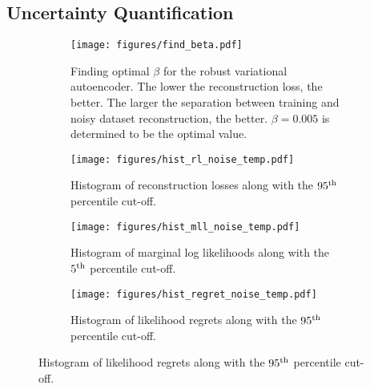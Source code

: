 \subsection{Uncertainty Quantification}
\label{sec:uncertainty_quantification}


\iffalse
\begin{figure*}
\begin{subfigure}{0.49\textwidth}
    \centering
    \texttt{[image: figures/find\_beta.pdf]}
    \caption{Finding optimal $\beta$ for the robust variational autoencoder. The lower the reconstruction loss, the better. The larger the separation between training and noisy dataset reconstruction, the better. $\beta=0.005$ is determined to be the optimal value.}
    \label{fig:findbeta_elbo_vs_beta}
\end{subfigure}
\hfill
\begin{subfigure}{0.49\textwidth}
    \centering
    \texttt{[image: figures/hist\_rl\_noise\_temp.pdf]}%
    \caption{Histogram of reconstruction losses along with the $95^{\rm th}$ percentile cut-off.}
    \label{fig:findbeta_hist0}
\end{subfigure}
\newline
\begin{subfigure}{0.49\textwidth}
    \centering
    \texttt{[image: figures/hist\_mll\_noise\_temp.pdf]}%
    \caption{Histogram of marginal log likelihoods along with the $5^{\rm th}$ percentile cut-off.}
    \label{fig:findbeta_hist1}
\end{subfigure}
\hfill
\begin{subfigure}{0.49\textwidth}
    \centering
    \texttt{[image: figures/hist\_regret\_noise\_temp.pdf]}%
    \caption{Histogram of likelihood regrets \citep{likelihood_regret} along with the $95^{\rm th}$ percentile cut-off.  }
    \label{fig:findbeta_hist2}

\end{subfigure}
\end{figure*}
